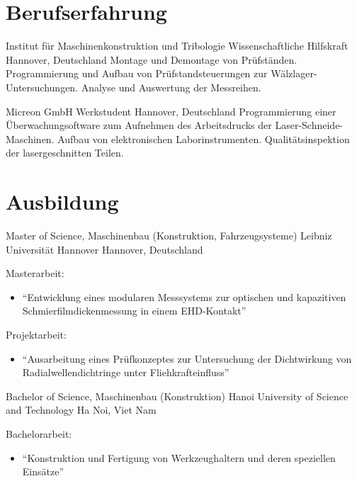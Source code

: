\documentclass[11pt,a4paper,sans]{moderncv}
\begin{document}
\section{\textbf{Berufserfahrung}}

{Institut für Maschinenkonstruktion und Tribologie}
{Wissenschaftliche Hilfskraft}
{Hannover, Deutschland}
{}
{
Montage und Demontage von Prüfständen.
Programmierung und Aufbau von Prüfstandsteuerungen zur Wälzlager-Untersuchungen.
Analyse und Auswertung der Messreihen.
}

{Micreon GmbH}
{Werkstudent}
{Hannover, Deutschland}
{}
{
Programmierung einer Überwachungsoftware zum Aufnehmen des Arbeitsdrucks der Laser-Schneide-Maschinen.
Aufbau von elektronischen Laborinstrumenten.
Qualitätsinspektion der lasergeschnitten Teilen.
}



\section{\textbf{Ausbildung}}

{Master of Science, Maschinenbau (Konstruktion, Fahrzeugsysteme)}
{Leibniz Universität Hannover}
{Hannover, Deutschland}
{}
{
    Masterarbeit:
    \begin{itemize}
        \item ``Entwicklung eines modularen Messsystems zur optischen und kapazitiven Schmierfilmdickenmessung in einem EHD-Kontakt''
    \end{itemize}
    Projektarbeit:
    \begin{itemize}
        \item "`Ausarbeitung eines Prüfkonzeptes zur Untersuchung der Dichtwirkung von Radialwellendichtringe unter Fliehkrafteinfluss"'
    \end{itemize}
}

{Bachelor of Science, Maschinenbau (Konstruktion)}
{Hanoi University of Science and Technology}
{Ha Noi, Viet Nam}
{}
{
    Bachelorarbeit:
    \begin{itemize}
        \item "`Konstruktion und Fertigung von Werkzeughaltern und deren speziellen Einsätze"'
    \end{itemize}
}
\end{document}
